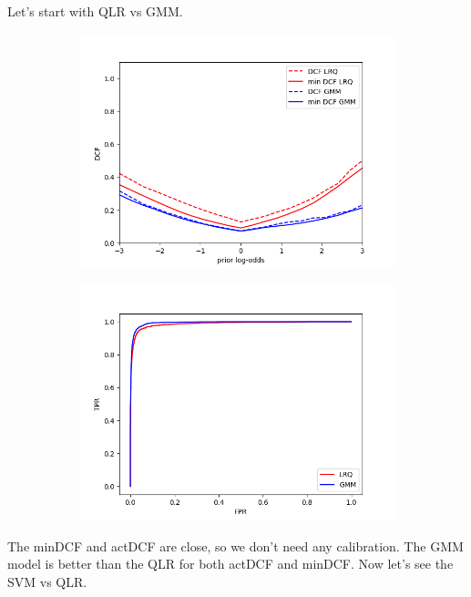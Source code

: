 \documentclass[english]{report}
\begin{document}
Let's start with QLR vs GMM.
\begin{figure}[H]
    \begin{subfigure}{0.5\textwidth}
        \includegraphics[scale=0.5]{../../images/comparison/evaluation/DCF_LRQ&GMM}
    \end{subfigure}
    \begin{subfigure}{0.5\textwidth}
        \includegraphics[scale=0.5]{../../images/comparison/evaluation/ROC_LRQ&GMM}
    \end{subfigure}
    \label{fig:eval_MVGvsGMM}
\end{figure}

The minDCF and actDCF are close, so we don't need any calibration.
The GMM model is better than the QLR for both actDCF and minDCF. Now let's see the SVM vs QLR.
\end{document}
